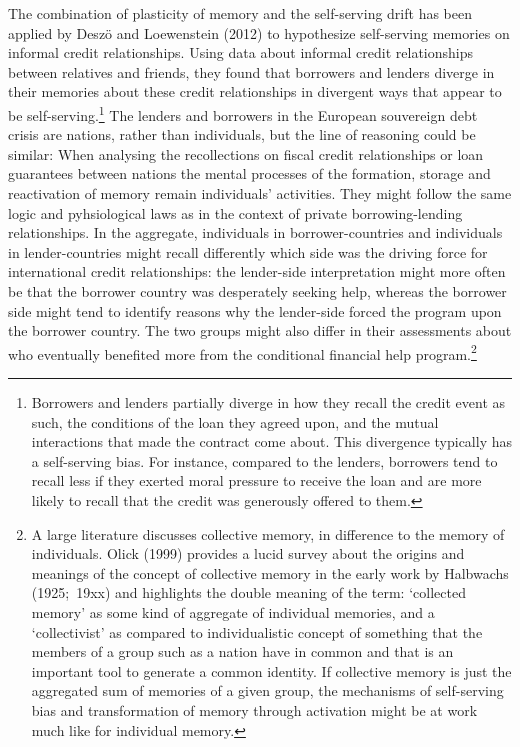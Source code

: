 The combination of plasticity of memory and the self-serving drift has been
applied by Desz\"{o} and Loewenstein (2012) to hypothesize self-serving
memories on informal credit relationships. Using data about informal credit
relationships between relatives and friends, they found that borrowers and
lenders diverge in their memories about these credit relationships in
divergent ways that appear to be self-serving.\footnote{%
Borrowers and lenders partially diverge in how they recall the credit event
as such, the conditions of the loan they agreed upon, and the mutual
interactions that made the contract come about. This divergence typically
has a self-serving bias. For instance, compared to the lenders, borrowers
tend to recall less if they exerted moral pressure to receive the loan and
are more likely to recall that the credit was generously offered to them.}
The lenders and borrowers in the European souvereign debt crisis are
nations, rather than individuals, but the line of reasoning could be
similar: When analysing the recollections on fiscal credit relationships or
loan guarantees between nations the mental processes of the formation,
storage and reactivation of memory remain individuals' activities. They
might follow the same logic and pyhsiological laws as in the context of
private borrowing-lending relationships. In the aggregate, individuals in
borrower-countries and individuals in lender-countries might recall
differently which side was the driving force for international credit
relationships: the lender-side interpretation might more often be that the
borrower country was desperately seeking help, whereas the borrower side
might tend to identify reasons why the lender-side forced the program upon
the borrower country. The two groups might also differ in their assessments
about who eventually benefited more from the conditional financial help
program.\footnote{%
A large literature discusses collective memory, in difference to the memory
of individuals. Olick (1999) provides a lucid survey about the origins and
meanings of the concept of collective memory in the early work by Halbwachs
(1925;\ 19xx) and highlights the double meaning of the term: `collected
memory' as some kind of aggregate of individual memories, and a
`collectivist' as compared to individualistic concept of something that the
members of a group such as a nation have in common and that is an important
tool to generate a common identity. If collective memory is just the
aggregated sum of memories of a given group, the mechanisms of self-serving
bias and transformation of memory through activation might be at work much
like for individual memory.}

